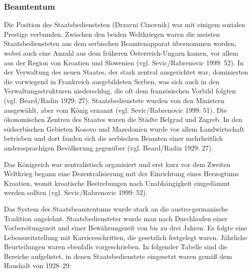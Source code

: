 \subsubsection{Beamtentum}
Die Position des Staatsbediensteten (Drzavni Cinovnik) war mit einigem sozialen Prestige verbunden. Zwischen den beiden Weltkriegen waren die meisten Staatsbediensteten aus dem serbischen Beamtenapparat übernommen worden, wobei auch eine Anzahl aus dem früheren Österreich-Ungarn kamen, vor allem aus der Region von Kroatien und Slowenien (vgl. Sevic/Rabrenovic 1999: 52). In der Verwaltung des neuen Staates, der stark zentral ausgerichtet war, dominierten die vorwiegend in Frankreich ausgebildeten Serben, was sich auch in den Verwaltungsstrukturen niederschlug, die oft dem französischen Vorbild folgten (vgl. Beard/Radin 1929: 27). Staatsbedienstete wurden von den Ministern ausgewählt, aber vom König ernannt (vgl. Sevic/Rabrenovic 1999: 51). Die ökonomischen Zentren des Staates waren die Städte Belgrad und Zagreb. In den südserbischen Gebieten Kosovo und Mazedonien wurde vor allem Landwirtschaft betrieben und dort fanden sich die serbischen Beamten einer mehrheitlich anderssprachigen Bevölkerung gegenüber (vgl. Beard/Radin 1929: 27).\par
Das Königreich war zentralistisch organisiert und erst kurz vor dem Zweiten Weltkrieg begann eine Dezentralisierung mit der Einrichtung eines Herzogtums Kroatien, womit kroatische Bestrebungen nach Unabhängigkeit eingedämmt werden sollten (vgl. Sevic/Rabrenovic 1999: 52).\par
Das System des Staatsbeamtentums wurde stark an die austro-germanische Tradition angelehnt. Staatsbediensteter wurde man nach Durchlaufen einer Vorbereitungszeit und einer Bewährungszeit von bis zu drei Jahren. Es folgte eine Lebenszeitstellung mit Karriereschritten, die gesetzlich festgelegt waren. Jährliche Beurteilungen waren ebenfalls vorgeschrieben. In folgender Tabelle sind die Bereiche aufgelistet, in denen Staatsbedienstete eingesetzt waren gemäß dem Haushalt von 1928–29:
